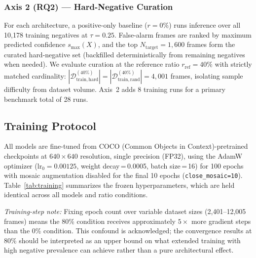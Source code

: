 \documentclass[conference]{IEEEtran}
\begin{document}
\subsubsection{Axis 2 (RQ2) --- Hard-Negative Curation}
For each architecture, a positive-only baseline ($r{=}0\%$) runs
inference over all 10,178 training negatives at $\tau{=}0.25$.
False-alarm frames are ranked by maximum predicted confidence
$s_{\max}(X)$, and the top $N_{\mathrm{target}}{=}1{,}600$ frames
form the curated hard-negative set (backfilled deterministically
from remaining negatives when needed). We evaluate curation at the
reference ratio $r_{\mathrm{ref}}{=}40\%$ with strictly matched
cardinality: $|\mathcal{D}_{\mathrm{train,hard}}^{(40\%)}|
= |\mathcal{D}_{\mathrm{train,rand}}^{(40\%)}| = 4{,}001$
frames, isolating sample difficulty from dataset volume. Axis~2
adds 8 training runs for a primary benchmark total of 28 runs.

\subsection{Training Protocol}
\label{subsec:protocol}

All models are fine-tuned from COCO (Common Objects in Context)-pretrained
checkpoints at $640 \times 640$ resolution, single precision (FP32),
using the AdamW optimizer ($\mathrm{lr}_0 = 0.00125$, weight
decay\,=\,0.0005, batch size\,=\,16) for 100 epochs with mosaic
augmentation disabled for the final 10 epochs
(\texttt{close\_mosaic=10}). Table~\ref{tab:training} summarizes
the frozen hyperparameters, which are held identical across all
models and ratio conditions.

\textit{Training-step note:} Fixing epoch count over variable
dataset sizes (2,401--12,005 frames) means the 80\% condition
receives approximately $5\times$ more gradient steps than the 0\%
condition. This confound is acknowledged; the convergence results
at 80\% should be interpreted as an upper bound on what extended
training with high negative prevalence can achieve rather than a
pure architectural effect.
\end{document}

